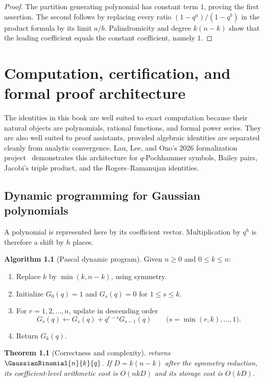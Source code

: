 \documentclass[11pt,a4paper,oneside,openany]{book}
\newtheorem{theorem}{Theorem}[chapter]
\theoremstyle{definition}
\newtheorem{algorithm}[algorithm]{Algorithm}
\theoremstyle{remark}
\begin{document}
\begin{proof}
The partition generating polynomial has constant term $1$, proving the first assertion.  The second follows by replacing every ratio $(1-q^a)/(1-q^b)$ in the product formula by its limit $a/b$.  Palindromicity and degree $k(n-k)$ show that the leading coefficient equals the constant coefficient, namely $1$.
\end{proof}



\chapter{Computation, certification, and formal proof architecture}\label{chap:formalization}

The identities in this book are well suited to exact computation because their natural objects are polynomials, rational functions, and formal power series.  They are also well suited to proof assistants, provided algebraic identities are separated cleanly from analytic convergence.  Lau, Lee, and Ono's 2026 formalization project~\cite{LauLeeOno2026} demonstrates this architecture for $q$-Pochhammer symbols, Bailey pairs, Jacobi's triple product, and the Rogers--Ramanujan identities.

\section{Dynamic programming for Gaussian polynomials}

A polynomial is represented here by its coefficient vector.  Multiplication by $q^h$ is therefore a shift by $h$ places.

\begin{algorithm}[Pascal dynamic program]\label{alg:gaussian-dp}
Given $n\ge0$ and $0\le k\le n$:
\begin{enumerate}
\item Replace $k$ by $\min(k,n-k)$, using symmetry.
\item Initialize $G_0(q)=1$ and $G_s(q)=0$ for $1\le s\le k$.
\item For $r=1,2,\ldots,n$, update in descending order
\[
 G_s(q)\leftarrow G_s(q)+q^{r-s}G_{s-1}(q)
 \qquad
 \bigl(s=\min(r,k),\ldots,1\bigr).
\]
\item Return $G_k(q)$.
\end{enumerate}
\end{algorithm}

\begin{theorem}[Correctness and complexity]\label{thm:gaussian-dp-correct}
 returns $\GaussianBinomial{n}{k}{q}$.  If $D=k(n-k)$ after the symmetry reduction, its coefficient-level arithmetic cost is $O(nkD)$ and its storage cost is $O(kD)$.
\end{theorem}
\end{document}
